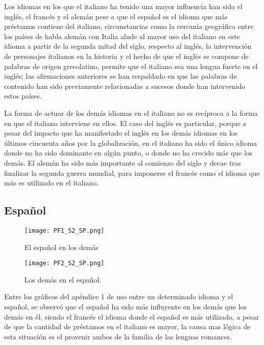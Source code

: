 Los idiomas en los que el italiano ha tenido una mayor influencia han sido el inglés, el francés y el alemán pese a que el español es el idioma que más préstamos contiene del  italiano,  circunstancias como la cercanía geográfica entre los países de habla alemán con Italia alude al  mayor uso del italiano en este idioma a partir de  la segunda mitad del siglo,  respecto al inglés,  la intervención de personajes  italianos en la historia y el hecho de que el inglés se compone de palabras de origen grecolatino,  permite que el italiano sea una lengua fuerte en el inglés;  las afirmaciones anteriores se han respaldado en que las palabras de contenido han sido previamente relacionadas  a sucesos donde han intervenido estos países.


La forma de actuar de los demás idiomas en el italiano no es recíproca a la forma en que el italiano interviene en ellos.  El caso del inglés es particular, porque a pesar del impacto que ha manifestado el inglés en los demás idiomas  en los últimos cincuenta años por la globalización,  en el italiano ha sido el único idioma donde no ha sido dominante en algún punto, o donde no ha crecido más que los demás.  El alemán ha sido más importante al comienzo del siglo y decae tras finalizar la segunda guerra mundial, para imponerse el francés como el idioma que más es utilizado en el italiano. 


\subsection{Español} %

\begin{figure}[h!] %
	\centering
	\texttt{[image: PF1\_S2\_SP.png]}
	\label{fig.ST_a_SP}
	\caption{El español en los demás}
\end{figure} %
		
\begin{figure}[h!] %
	\centering
	\texttt{[image: PF2\_S2\_SP.png]}
	\label{fig.ST_b_SP}
	\caption{Los demás en el español.}
\end{figure} %


Entre los gráficos del apéndice 1 de uso entre un determinado idioma y el español, se observó que el español ha sido más influyente en los demás que los demás en él,  siendo el francés el idioma donde el español es más utilizado, a pesar de que la cantidad de préstamos en el italiano es mayor, la causa mas lógica  de esta situación es el provenir ambos de la familia de las lenguas romances. 

